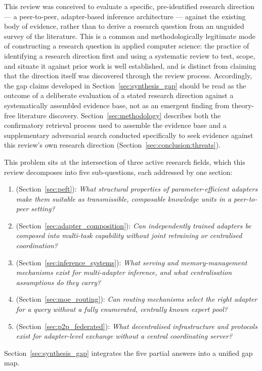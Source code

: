 This review was conceived to evaluate a specific, pre-identified research
direction --- a peer-to-peer, adapter-based inference architecture --- against
the existing body of evidence, rather than to derive a research question
from an unguided survey of the literature. This is a common and
methodologically legitimate mode of constructing a research question in
applied computer science: the practice of identifying a research direction
first and using a systematic review to test, scope, and situate it against
prior work is well established, and is distinct from claiming that the
direction itself was discovered through the review process. Accordingly,
the gap claims developed in Section~\ref{sec:synthesis_gap} should be read
as the outcome of a deliberate evaluation of a stated research direction
against a systematically assembled evidence base, not as an emergent
finding from theory-free literature discovery. Section~\ref{sec:methodology}
describes both the confirmatory retrieval process used to assemble the
evidence base and a supplementary adversarial search conducted
specifically to seek evidence against this review's own research
direction (Section~\ref{sec:conclusion:threats}).

This problem sits at the intersection of three active research fields, which this
review decomposes into five sub-questions, each addressed by one section:
\begin{enumerate}
  \item[\textbf{SQ1}] (Section~\ref{sec:peft}): \textit{What structural properties of
    parameter-efficient adapters make them suitable as transmissible, composable
    knowledge units in a peer-to-peer setting?}
  \item[\textbf{SQ2}] (Section~\ref{sec:adapter_composition}): \textit{Can
    independently trained adapters be composed into multi-task capability without
    joint retraining or centralised coordination?}
  \item[\textbf{SQ3}] (Section~\ref{sec:inference_systems}): \textit{What serving and
    memory-management mechanisms exist for multi-adapter inference, and what
    centralisation assumptions do they carry?}
  \item[\textbf{SQ4}] (Section~\ref{sec:moe_routing}): \textit{Can routing mechanisms
    select the right adapter for a query without a fully enumerated, centrally known
    expert pool?}
  \item[\textbf{SQ5}] (Section~\ref{sec:p2p_federated}): \textit{What decentralised
    infrastructure and protocols exist for adapter-level exchange without a central
    coordinating server?}
\end{enumerate}
Section~\ref{sec:synthesis_gap} integrates the five partial answers into a unified gap
map.

